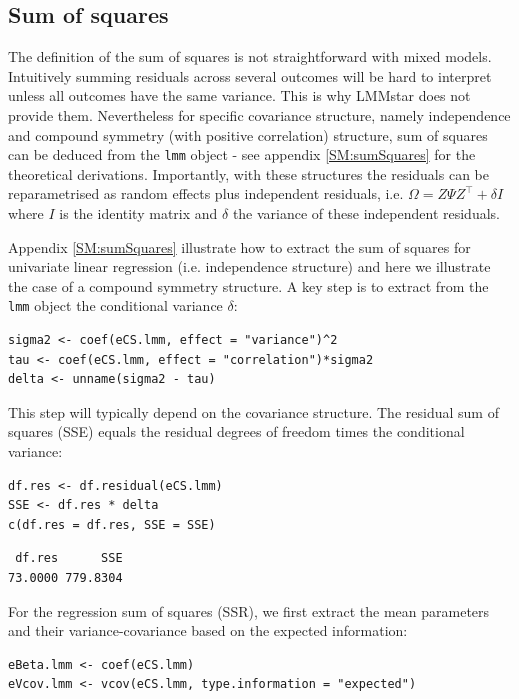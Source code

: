 \documentclass[12pt]{article}
\newcommand\Warning[1][3ex]{%
\renewcommand\stacktype{L}%
\scaleto{\stackon[1.3pt]{\color{red}$\triangle$}{\tiny\bfseries !}}{#1}%
\xspace
}
\newcommand\trans[1]{{#1}^\intercal}%
\begin{document}
\clearpage

\subsection{Sum of squares}
\label{sec:org63f9afc}

\Warning The definition of the sum of squares is not straightforward with mixed
models. Intuitively summing residuals across several outcomes will be
hard to interpret unless all outcomes have the same variance. This is
why LMMstar does not provide them. Nevertheless for specific
covariance structure, namely independence and compound symmetry (with
positive correlation) structure, sum of squares can be deduced from
the \texttt{lmm} object - see appendix \ref{SM:sumSquares} for the theoretical
derivations. Importantly, with these structures the residuals can be
reparametrised as random effects plus independent residuals,
i.e. \(\Omega = Z \Psi \trans{Z} + \delta I\) where \(I\) is the
identity matrix and \(\delta\) the variance of these independent
residuals.

\bigskip

Appendix \ref{SM:sumSquares} illustrate how to extract the sum of squares
for univariate linear regression (i.e. independence structure) and
here we illustrate the case of a compound symmetry structure.  A key
step is to extract from the \texttt{lmm} object the conditional variance
\(\delta\):
\lstset{language=r,label= ,caption= ,captionpos=b,numbers=none}
\begin{lstlisting}
sigma2 <- coef(eCS.lmm, effect = "variance")^2
tau <- coef(eCS.lmm, effect = "correlation")*sigma2
delta <- unname(sigma2 - tau)
\end{lstlisting}

This step will typically depend on the covariance structure. The
residual sum of squares (SSE) equals the residual degrees of freedom
times the conditional variance:
\lstset{language=r,label= ,caption= ,captionpos=b,numbers=none}
\begin{lstlisting}
df.res <- df.residual(eCS.lmm)
SSE <- df.res * delta
c(df.res = df.res, SSE = SSE)
\end{lstlisting}

\begin{verbatim}
 df.res      SSE 
73.0000 779.8304
\end{verbatim}


For the regression sum of squares (SSR), we first extract the mean
parameters and their variance-covariance based on the expected
information:
\lstset{language=r,label= ,caption= ,captionpos=b,numbers=none}
\begin{lstlisting}
eBeta.lmm <- coef(eCS.lmm)
eVcov.lmm <- vcov(eCS.lmm, type.information = "expected")
\end{lstlisting}
\end{document}

